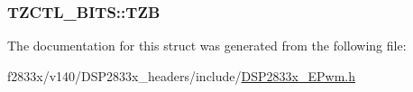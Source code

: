 \subsubsection[{T\+Z\+B}]{ T\+Z\+C\+T\+L\+\_\+\+B\+I\+T\+S\+::\+T\+Z\+B}\label{struct_t_z_c_t_l___b_i_t_s_a04447a5e9e039ca172fe8e6168243cf2}


The documentation for this struct was generated from the following file\+:\begin{DoxyCompactItemize}
\item 
f2833x/v140/\+D\+S\+P2833x\+\_\+headers/include/\hyperlink{_d_s_p2833x___e_pwm_8h}{D\+S\+P2833x\+\_\+\+E\+Pwm.\+h}\end{DoxyCompactItemize}
